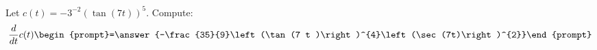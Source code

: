 \documentclass{ximera}
\author{Bart Snapp\and Nela Lakos}
\begin{document}
\begin{exercise}
Let $c(t) = -3^{-2} \left(\tan (7 t )\right)^5$. Compute:
\[
\frac{d}{dt}c(t)
\begin{prompt}=\answer{-\frac{35}{9}\left(\tan (7 t )\right)^{4}\left(\sec(7t)\right)^{2}}\end{prompt}
\]
\end{exercise}
\end{document}
